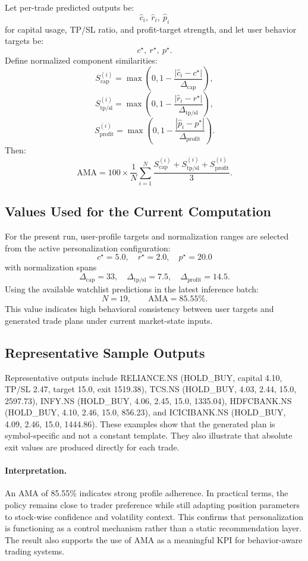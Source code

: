 Let per-trade predicted outputs be:
\[
\hat{c}_i,\ \hat{r}_i,\ \hat{p}_i
\]
for capital usage, TP/SL ratio, and profit-target strength, and let user behavior targets be:
\[
c^\star,\ r^\star,\ p^\star.
\]
Define normalized component similarities:
\[
S^{(i)}_{\text{cap}}=\max\left(0,1-\frac{|\hat{c}_i-c^\star|}{\Delta_{\text{cap}}}\right),
\]
\[
S^{(i)}_{\text{tp/sl}}=\max\left(0,1-\frac{|\hat{r}_i-r^\star|}{\Delta_{\text{tp/sl}}}\right),
\]
\[
S^{(i)}_{\text{profit}}=\max\left(0,1-\frac{|\hat{p}_i-p^\star|}{\Delta_{\text{profit}}}\right).
\]
Then:
\[
\mathrm{AMA}=100\times\frac{1}{N}\sum_{i=1}^{N}
\frac{
S^{(i)}_{\text{cap}}+S^{(i)}_{\text{tp/sl}}+S^{(i)}_{\text{profit}}
}{3}.
\]

\subsection{Values Used for the Current Computation}

For the present run, user-profile targets and normalization ranges are selected from the active personalization configuration:
\[
c^\star=5.0,\quad r^\star=2.0,\quad p^\star=20.0
\]
with normalization spans
\[
\Delta_{\text{cap}}=33,\quad \Delta_{\text{tp/sl}}=7.5,\quad \Delta_{\text{profit}}=14.5.
\]
Using the available watchlist predictions in the latest inference batch:
\[
N=19,\qquad \boxed{\mathrm{AMA}=85.55\%}.
\]
This value indicates high behavioral consistency between user targets and generated trade plans under current market-state inputs.

\subsection{Representative Sample Outputs}

Representative outputs include RELIANCE.NS (HOLD\_BUY, capital 4.10, TP/SL 2.47, target 15.0, exit 1519.38), TCS.NS (HOLD\_BUY, 4.03, 2.44, 15.0, 2597.73), INFY.NS (HOLD\_BUY, 4.06, 2.45, 15.0, 1335.04), HDFCBANK.NS (HOLD\_BUY, 4.10, 2.46, 15.0, 856.23), and ICICIBANK.NS (HOLD\_BUY, 4.09, 2.46, 15.0, 1444.86). These examples show that the generated plan is symbol-specific and not a constant template. They also illustrate that absolute exit values are produced directly for each trade.

\paragraph{Interpretation.}
An AMA of 85.55\% indicates strong profile adherence. In practical terms, the policy remains close to trader preference while still adapting position parameters to stock-wise confidence and volatility context. This confirms that personalization is functioning as a control mechanism rather than a static recommendation layer. The result also supports the use of AMA as a meaningful KPI for behavior-aware trading systems.

